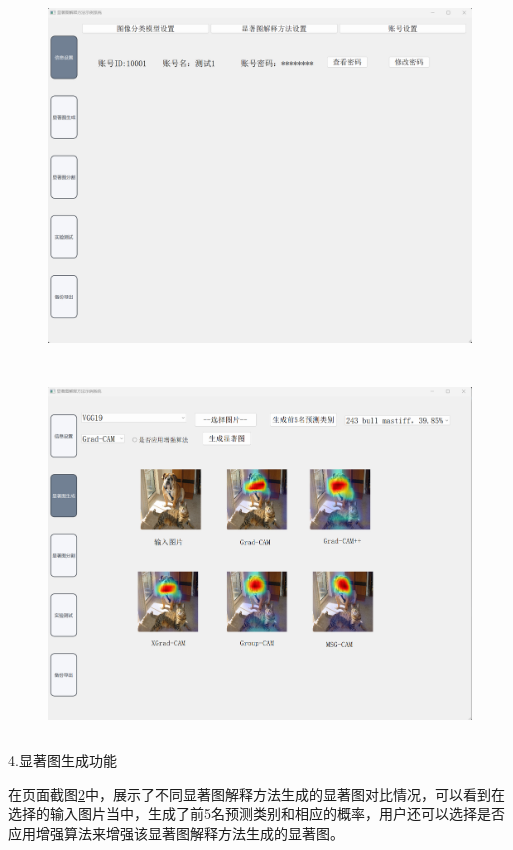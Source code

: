 \begin{figure}[h]
	\centering 
	\includegraphics[width=15cm,height=9.5cm]{fig/ch5/f3.png}
	\label{fig:f3}
\end{figure}
\begin{figure}[H]
	\centering 
	\includegraphics[width=15cm,height=9.5cm]{fig/ch5/f4.png}
	\label{fig:f4}
\end{figure}

4.显著图生成功能

在页面截图\ref{fig:f4}中，展示了不同显著图解释方法生成的显著图对比情况，可以看到在选择的输入图片当中，生成了前5名预测类别和相应的概率，用户还可以选择是否应用增强算法来增强该显著图解释方法生成的显著图。


